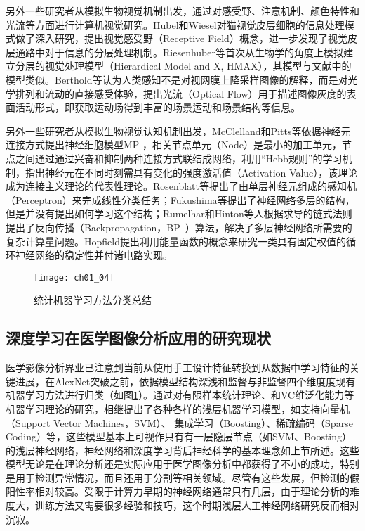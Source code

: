 另外一些研究者从模拟生物视觉机制出发，通过对感受野、注意机制、颜色特性和光流等方面进行计算机视觉研究。Hubel和Wiesel\citep{Hubel1962Receptive}对猫视觉皮层细胞的信息处理模式做了深入研究，提出视觉感受野（Receptive Field）概念，进一步发现了视觉皮层通路中对于信息的分层处理机制。Riesenhuber等\citep{Riesenhuber1999}首次从生物学的角度上模拟建立分层的视觉处理模型（Hierardical Model and X, HMAX），其模型与文献中的模型类似。Berthold等\citep{Horn1981}认为人类感知不是对视网膜上降采样图像的解释，而是对光学排列和流动的直接感受体验，提出光流（Optical Flow）用于描述图像灰度的表面活动形式，即获取运动场得到丰富的场景运动和场景结构等信息。

另外一些研究者从模拟生物视觉认知机制出发，McClelland和Pitts等依据神经元连接方式提出神经细胞模型MP ，相关节点单元（Node）是最小的加工单元，节点之间通过通过兴奋和抑制两种连接方式联结成网络，利用“Hebb规则”的学习机制，指出神经元在不同时刻需具有变化的强度激活值（Activation Value），该理论成为连接主义理论的代表性理论。Rosenblatt等\citep{Rosenblatt1958}提出了由单层神经元组成的感知机（Perceptron）来完成线性分类任务；Fukushima等\citep{Fukushima1982Neocognitron}提出了神经网络多层的结构，但是并没有提出如何学习这个结构；Rumelhar和Hinton等人\citep{Rumelhart1988Learning}根据求导的链式法则提出了反向传播（Backpropagation，BP ）算法，解决了多层神经网络所需要的复杂计算量问题。Hopfield提出利用能量函数的概念来研究一类具有固定权值的循环神经网络的稳定性并付诸电路实现。

\begin{figure}[!htbp]
    \centering
    \texttt{[image: ch01\_04]}
    \caption{统计机器学习方法分类总结}
    \label{fig:ch01_04}
\end{figure}

\subsection{深度学习在医学图像分析应用的研究现状}


医学影像分析界业已注意到当前从使用手工设计特征转换到从数据中学习特征的关键进展，在AlexNet突破之前，依据模型结构深浅和监督与非监督四个维度度现有机器学习方法进行归类（如图\ref{fig:ch01_04}）。通过对有限样本统计理论、和VC维泛化能力等机器学习理论的研究，相继提出了各种各样的浅层机器学习模型，如支持向量机（Support Vector Machines，SVM）、 集成学习（Boosting）、稀疏编码（Sparse Coding）等，这些模型基本上可视作只有有一层隐层节点（如SVM、Boosting）的浅层神经网络，神经网络和深度学习背后神经科学的基本理念如上节所述。这些模型无论是在理论分析还是实际应用于医学图像分析中都获得了不小的成功，特别是用于检测异常情况，而且还用于分割等相关领域。尽管有这些发展，但检测的假阳性率相对较高。受限于计算力早期的神经网络通常只有几层，由于理论分析的难度大，训练方法又需要很多经验和技巧，这个时期浅层人工神经网络研究反而相对沉寂。

